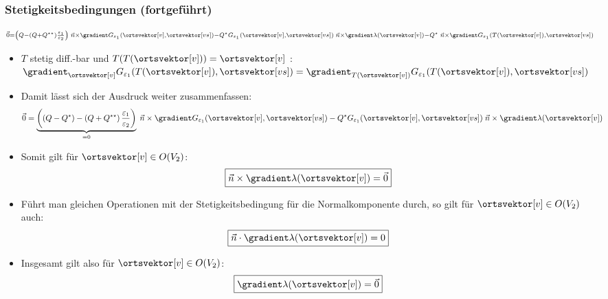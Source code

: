       \begin{frame}
     \frametitle{Stetigkeitsbedingungen (fortgeführt)}
        \begin{equation*}
          {\scriptstyle \vec{0} = \left( Q  - \left( Q +  Q^{\star\star}\right) \frac{\varepsilon_1}{\varepsilon_2} \right)\; \vec{n}\times \gradient G_{\varepsilon_1}(\ortsvektor[v], \ortsvektor[vs])  
          - Q^\star G_{\varepsilon_1}(\ortsvektor[v], \ortsvektor[vs])\; \vec{n}\times\gradient \lambda(\ortsvektor[v]) - Q^\star \; \vec{n}\times\gradient G_{\varepsilon_1}(T(\ortsvektor[v]), \ortsvektor[vs])}
        \end{equation*}
      \begin{itemize}[<+->]
      \item $T$ stetig diff.-bar und $T(T(\ortsvektor[v]))=\ortsvektor[v]$ : $\gradient_{\ortsvektor[v]} G_{\varepsilon_1}(T(\ortsvektor[v]), \ortsvektor[vs])  = \gradient_{T(\ortsvektor[v])} G_{\varepsilon_1}(T(\ortsvektor[v]), \ortsvektor[vs])$
        \item Damit lässt sich der Ausdruck weiter zusammenfassen:
        \begin{align*}
          \vec{0} &= \underbrace{\left( \left(Q - Q^\star\right) - \left( Q +  Q^{\star\star}\right) \frac{\varepsilon_1}{\varepsilon_2} \right)}_{=0}\; \vec{n}\times \gradient G_{\varepsilon_1}(\ortsvektor[v], \ortsvektor[vs])   - Q^\star G_{\varepsilon_1}(\ortsvektor[v], \ortsvektor[vs])\; \vec{n}\times\gradient \lambda(\ortsvektor[v]) 
        \end{align*}
      \item Somit gilt für $\ortsvektor[v]\in O(V_2)$:
        \begin{equation*}
          \boxed{\vec{n}\times\gradient \lambda(\ortsvektor[v]) = \vec{0}}
          \end{equation*}

     \item Führt man gleichen Operationen mit der Stetigkeitsbedingung für die Normalkomponente durch, so gilt für $\ortsvektor[v]\in O(V_2)$ auch:
        \begin{equation*}
          \boxed{\vec{n}\cdot\gradient \lambda(\ortsvektor[v]) = 0}
          \end{equation*}
 \item Insgesamt gilt also für $\ortsvektor[v]\in O(V_2)$:
        \begin{equation*}
          \boxed{\gradient \lambda(\ortsvektor[v]) = \vec{0}}
          \end{equation*}
        \end{itemize}
      \end{frame}

